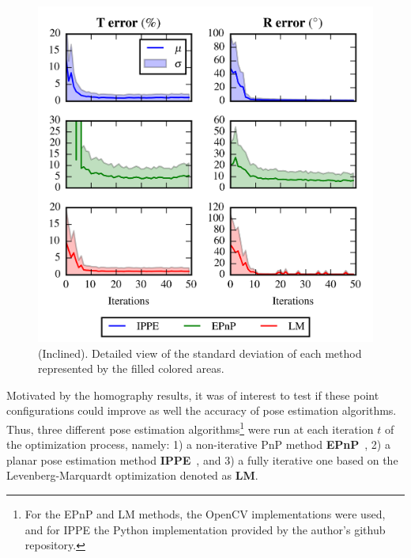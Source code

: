 \documentclass[letterpaper, 10 pt, conference]{ieeeconf}  %
\begin{document}
	\begin{figure}[t]
		\begin{center}
			\includegraphics[width=\columnwidth]{img/pose_separate_inclined.png}
			\caption{\label{fig:IN_pnp_results_detailed}\small (Inclined). Detailed view of the standard deviation of each method represented by the filled colored areas.}
		\end{center}
		\vspace{-0.5cm}
	\end{figure}
	
	
	
	Motivated by the homography results, it was of interest to test if these point configurations could improve as well the accuracy of pose estimation algorithms. Thus, three different pose estimation algorithms\footnote{For the EPnP and LM methods, the OpenCV implementations were used, and for IPPE the Python implementation provided by the author's github repository.} were run at each iteration $t$ of the optimization process, namely: 1) a non-iterative PnP method \textbf{EPnP}~\cite{Lepetit2008}, 2) a planar pose estimation method \textbf{IPPE}~\cite{Collins2014}, and 3) a fully iterative one based on the Levenberg-Marquardt optimization denoted as \textbf{LM}. 
	
\end{document}
